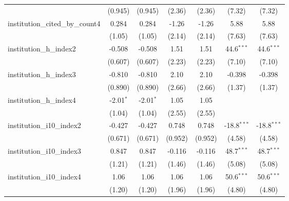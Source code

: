 \begin{tabular}{lcccccc}
                                         & (0.945)       & (0.945)       & (2.36)        & (2.36)        & (7.32)        & (7.32)\\   
   institution\_cited\_by\_count4        & 0.284         & 0.284         & -1.26         & -1.26         & 5.88          & 5.88\\   
                                         & (1.05)        & (1.05)        & (2.14)        & (2.14)        & (7.63)        & (7.63)\\   
   institution\_h\_index2                & -0.508        & -0.508        & 1.51          & 1.51          & 44.6$^{***}$  & 44.6$^{***}$\\   
                                         & (0.607)       & (0.607)       & (2.23)        & (2.23)        & (7.10)        & (7.10)\\   
   institution\_h\_index3                & -0.810        & -0.810        & 2.10          & 2.10          & -0.398        & -0.398\\   
                                         & (0.890)       & (0.890)       & (2.66)        & (2.66)        & (1.37)        & (1.37)\\   
   institution\_h\_index4                & -2.01$^{*}$   & -2.01$^{*}$   & 1.05          & 1.05          &               &   \\   
                                         & (1.04)        & (1.04)        & (2.55)        & (2.55)        &               &   \\   
   institution\_i10\_index2              & -0.427        & -0.427        & 0.748         & 0.748         & -18.8$^{***}$ & -18.8$^{***}$\\   
                                         & (0.671)       & (0.671)       & (0.952)       & (0.952)       & (4.58)        & (4.58)\\   
   institution\_i10\_index3              & 0.847         & 0.847         & -0.116        & -0.116        & 48.7$^{***}$  & 48.7$^{***}$\\   
                                         & (1.21)        & (1.21)        & (1.46)        & (1.46)        & (5.08)        & (5.08)\\   
   institution\_i10\_index4              & 1.06          & 1.06          & 1.06          & 1.06          & 50.6$^{***}$  & 50.6$^{***}$\\   
                                         & (1.20)        & (1.20)        & (1.96)        & (1.96)        & (4.80)        & (4.80)\\   

\end{tabular}
